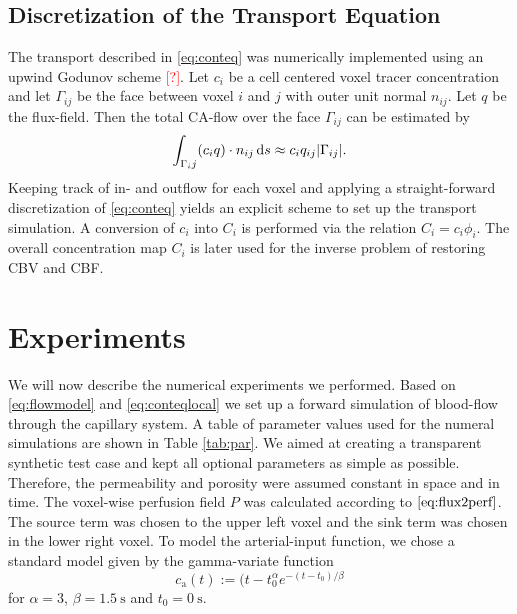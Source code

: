 \documentclass[paper=a4, fontsize=11pt,parskip=half,headings=small]{scrartcl}
\newcommand{\ca}{c_\mathrm{a}}
\newcommand{\missingsource}{\textcolor{red}{[?]}}
\begin{document}
	\subsection{Discretization of the Transport Equation} \label{sec:numtrans}
	The transport described in \eqref{eq:conteq} was numerically implemented using an upwind Godunov scheme \missingsource.
	Let $c_i$ be a cell centered voxel tracer concentration and let $\Gamma_{ij}$ be the face between voxel $i$ and $j$ with outer unit normal $n_{ij}$.
	Let $q$ be the flux-field. 
	Then the total CA-flow over the face $\Gamma_{ij}$ can be estimated by
	\[
		\int_{\Gamma_ij} (c_i q)\cdot n_{ij} \,\mathrm{d} s \approx c_i q_{ij} \vert \Gamma_{ij} \vert.
	\]
	Keeping track of in- and outflow for each voxel and applying a straight-forward discretization of \eqref{eq:conteq} yields an explicit scheme to set up the transport simulation.
	A conversion of $c_i$ into $C_i$ is performed via the relation $C_i = c_i\phi_i$. 
	The overall concentration map $C_i$ is later used for the inverse problem of restoring CBV and CBF.





	\section{Experiments}\label{sec:NumExp}

	We will now describe the numerical experiments we performed.
	Based on \eqref{eq:flowmodel} and \eqref{eq:conteqlocal} we set up a forward simulation of blood-flow through the capillary system.
	A table of parameter values used for the numeral simulations are shown in Table \ref{tab:par}. 
	We aimed at creating a transparent synthetic test case and kept all optional parameters as simple as possible. 
	Therefore, the permeability and porosity were assumed constant in space and in time.
	The voxel-wise perfusion field $P$ was calculated according to $\eqref{eq:flux2perf}$. 
	The source term was chosen to the upper left voxel and the sink term was chosen in the lower right voxel.
	To model the arterial-input function, we chose a standard model \cite{ostergaard96} given by the gamma-variate \cite{chan04} function
	\[
		\ca(t) := (t-t_0^\alpha e^{-(t-t_0)/\beta}
	\]
	for $\alpha=3$, $\beta = \SI{1.5}{\second}$ and $t_0 = \SI{0}{\second}$.
	
\end{document}
